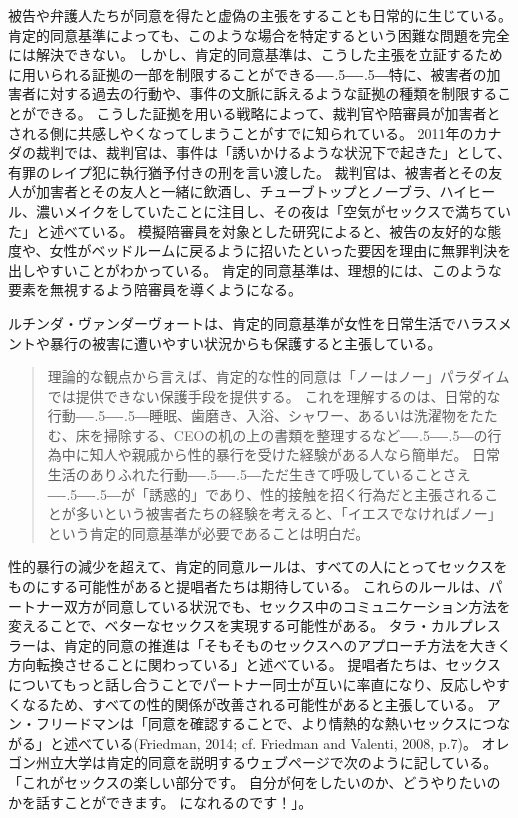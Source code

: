 \documentclass[paper=a4,book,openany]{jlreq}
\newcommand{\ig}[1]{}           %
\def\DDASH{―\kern-.5\zw―\kern-.5\zw―} %
\begin{document}
被告や弁護人たちが同意を得たと虚偽の主張をすることも日常的に生じている。
肯定的同意基準によっても、このような場合を特定するという困難な問題を完全には解決できない。
しかし、肯定的同意基準は、こうした主張を立証するために用いられる証拠の一部を制限することができる{\DDASH}特に、被害者の加害者に対する過去の行動や、事件の文脈に訴えるような証拠の種類を制限することができる。
こうした証拠を用いる戦略によって、裁判官や陪審員が加害者とされる側に共感しやくなってしまうことがすでに知られている。
2011年のカナダの裁判では、裁判官は、事件は「誘いかけるような状況下で起きた」として、有罪のレイプ犯に執行猶予付きの刑を言い渡した。
裁判官は、被害者とその友人が加害者とその友人と一緒に飲酒し、チューブトップとノーブラ、ハイヒール、濃いメイクをしていたことに注目し、その夜は「空気がセックスで満ちていた」と述べている\citep{cbc11:_manit_judge_rebuk_sex_assaul_remar}。
模擬陪審員を対象とした研究によると、被告の友好的な態度や、女性がベッドルームに戻るように招いたといった要因を理由に無罪判決を出しやすいことがわかっている\citep{finch06:_break_bound}。
肯定的同意基準は、理想的には、このような要素を無視するよう陪審員を導くようになる。

ルチンダ・ヴァンダーヴォート\ig{Lucinda Vandervort}は、肯定的同意基準が女性を日常生活でハラスメントや暴行の被害に遭いやすい状況からも保護すると主張している。

\begin{quote}
  理論的な観点から言えば、肯定的な性的同意は「ノーはノー」パラダイムでは提供できない保護手段を提供する。
これを理解するのは、日常的な行動{\DDASH}睡眠、歯磨き、入浴、シャワー、あるいは洗濯物をたたむ、床を掃除する、CEOの机の上の書類を整理するなど{\DDASH}の行為中に知人や親戚から性的暴行を受けた経験がある人なら簡単だ。
日常生活のありふれた行動{\DDASH}ただ生きて呼吸していることさえ{\DDASH}が「誘惑的」であり、性的接触を招く行為だと主張されることが多いという被害者たちの経験を考えると、「イエスでなければノー」という肯定的同意基準が必要であることは明白だ。
\citep[p.405]{vandervort12:_affir_sexual_consen_canad_law}
\end{quote}

性的暴行の減少を超えて、肯定的同意ルールは、すべての人にとってセックスをものにする可能性があると提唱者たちは期待している。
これらのルールは、パートナー双方が同意している状況でも、セックス中のコミュニケーション方法を変えることで、ベターなセックスを実現する可能性がある。
タラ・カルプレスラーは、肯定的同意の推進は「そもそものセックスへのアプローチ方法を大きく方向転換させることに関わっている」と述べている。
提唱者たちは、セックスについてもっと話し合うことでパートナー同士が互いに率直になり、反応しやすくなるため、すべての性的関係が改善される可能性があると主張している。
アン・フリードマン\ig{Ann Friedman}は「同意を確認することで、より情熱的な熱いセックスにつながる」と述べている(Friedman, 2014; cf. Friedman and Valenti, 2008, p.7)。
\nocite{friedman14:_oh_yes_means_yes}\nocite{friedman08:_yes_means_yes}
オレゴン州立大学は肯定的同意を説明するウェブページで次のように記している。
「これがセックスの楽しい部分です。
自分が何をしたいのか、どうやりたいのかを話すことができます。
になれるのです！」\citep{moyer14:_how_calif_yes_means_yes}。
\end{document}
